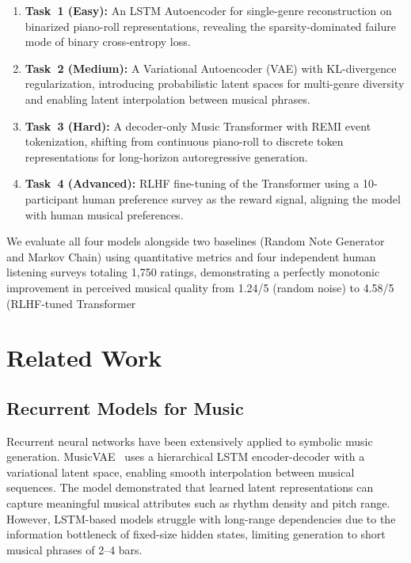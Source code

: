 \documentclass[conference]{IEEEtran}
\begin{document}
\begin{enumerate}
    \item \textbf{Task~1 (Easy):} An LSTM Autoencoder for single-genre reconstruction on binarized piano-roll representations, revealing the sparsity-dominated failure mode of binary cross-entropy loss.
    \item \textbf{Task~2 (Medium):} A Variational Autoencoder (VAE) with KL-divergence regularization, introducing probabilistic latent spaces for multi-genre diversity and enabling latent interpolation between musical phrases.
    \item \textbf{Task~3 (Hard):} A decoder-only Music Transformer with REMI event tokenization, shifting from continuous piano-roll to discrete token representations for long-horizon autoregressive generation.
    \item \textbf{Task~4 (Advanced):} RLHF fine-tuning of the Transformer using a 10-participant human preference survey as the reward signal, aligning the model with human musical preferences.
\end{enumerate}
 
We evaluate all four models alongside two baselines (Random Note Generator and Markov Chain) using quantitative metrics and four independent human listening surveys totaling 1,750 ratings, demonstrating a perfectly monotonic improvement in perceived musical quality from 1.24/5 (random noise) to 4.58/5 (RLHF-tuned Transformer
\section{Related Work}

\subsection{Recurrent Models for Music}

Recurrent neural networks have been extensively applied to symbolic music generation. MusicVAE~\cite{roberts2018} uses a hierarchical LSTM encoder-decoder with a variational latent space, enabling smooth interpolation between musical sequences. The model demonstrated that learned latent representations can capture meaningful musical attributes such as rhythm density and pitch range. However, LSTM-based models struggle with long-range dependencies due to the information bottleneck of fixed-size hidden states, limiting generation to short musical phrases of 2--4 bars.
\end{document}
